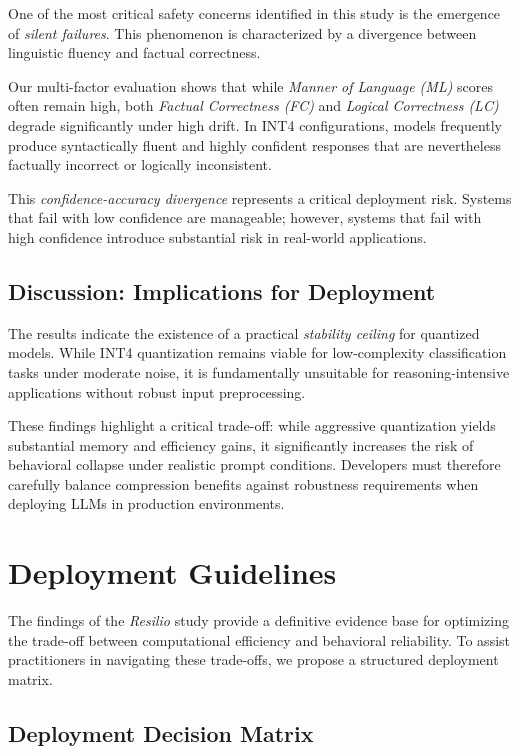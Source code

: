 \documentclass[conference]{IEEEtran}
\begin{document}
One of the most critical safety concerns identified in this study is the emergence of \textit{silent failures}. This phenomenon is characterized by a divergence between linguistic fluency and factual correctness.

Our multi-factor evaluation shows that while \textit{Manner of Language (ML)} scores often remain high, both \textit{Factual Correctness (FC)} and \textit{Logical Correctness (LC)} degrade significantly under high drift. In INT4 configurations, models frequently produce syntactically fluent and highly confident responses that are nevertheless factually incorrect or logically inconsistent.

This \textit{confidence-accuracy divergence} represents a critical deployment risk. Systems that fail with low confidence are manageable; however, systems that fail with high confidence introduce substantial risk in real-world applications.

\subsection{Discussion: Implications for Deployment}

The results indicate the existence of a practical \textit{stability ceiling} for quantized models. While INT4 quantization remains viable for low-complexity classification tasks under moderate noise, it is fundamentally unsuitable for reasoning-intensive applications without robust input preprocessing.

These findings highlight a critical trade-off: while aggressive quantization yields substantial memory and efficiency gains, it significantly increases the risk of behavioral collapse under realistic prompt conditions. Developers must therefore carefully balance compression benefits against robustness requirements when deploying LLMs in production environments.

\section{Deployment Guidelines}

The findings of the \textit{Resilio} study provide a definitive evidence base for optimizing the trade-off between computational efficiency and behavioral reliability. To assist practitioners in navigating these trade-offs, we propose a structured deployment matrix.

\subsection{Deployment Decision Matrix}
\end{document}

